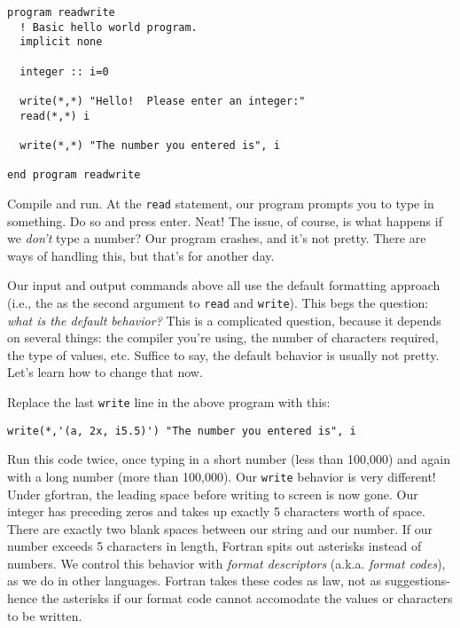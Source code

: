 \documentclass[11pt, letterpaper]{article}
\begin{document}
\begin{verbatim}
program readwrite
  ! Basic hello world program.
  implicit none
  
  integer :: i=0
  
  write(*,*) "Hello!  Please enter an integer:"
  read(*,*) i

  write(*,*) "The number you entered is", i

end program readwrite
\end{verbatim}

Compile and run.  At the {\tt read} statement, our program prompts you to type
in something.  Do so and press enter.  Neat!  The issue, of course, is what
happens if we \emph{don't} type a number?  Our program crashes, and it's not
pretty.  There are ways of handling this, but that's for another day.

Our input and output commands above all use the default formatting approach
(i.e., the {\tt *} as the second argument to {\tt read} and {\tt write}).  This
begs the question: \emph{what is the default behavior?}  This is a complicated
question, because it depends on several things: the compiler you're using, the
number of characters required, the type of values, etc.  Suffice to say, the
default behavior is usually not pretty.  Let's learn how to change that now.

Replace the last {\tt write} line in the above program with this:

\begin{verbatim}
write(*,'(a, 2x, i5.5)') "The number you entered is", i
\end{verbatim}

Run this code twice, once typing in a short number (less than 100,000) and again
with a long number (more than 100,000).
Our {\tt write} behavior is very different!  Under gfortran, the leading space
before writing to screen is now gone.  Our integer has preceding zeros and takes
up exactly 5 characters worth of space.  There are exactly two blank spaces
between our string and our number.  If our number exceeds 5 characters in
length, Fortran spits out asterisks instead of numbers.
We control this behavior with \emph{format descriptors}
(a.k.a. \emph{format codes}), as we do in other languages.
Fortran takes these codes as law, not as suggestions- hence the asterisks if
our format code cannot accomodate the values or characters to be written.
\end{document}
